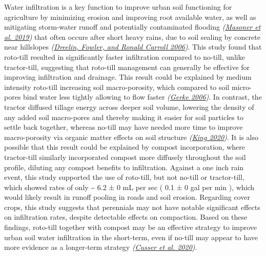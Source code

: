 \documentclass[
  12pt,
]{article}
\begin{document}
Water infiltration is a key function to improve urban soil functioning for agriculture by minimizing erosion and improving root available water, as well as mitigating storm-water runoff and potentially contaminated flooding \emph{(\protect\hyperlink{ref-masoner19}{Masoner et al. 2019})} that often occurs after short heavy rains, due to soil sealing by concrete near hillslopes \emph{(\protect\hyperlink{ref-dreelin06}{Dreelin, Fowler, and Ronald Carroll 2006})}.
This study found that roto-till resulted in significantly faster infiltration compared to no-till, unlike tractor-till, suggesting that roto-till management can generally be effective for improving infiltration and drainage.
This result could be explained by medium intensity roto-till increasing soil macro-porosity, which compared to soil micro-pores bind water less tightly allowing to flow faster \emph{(\protect\hyperlink{ref-gerke06}{Gerke 2006})}.
In contrast, the tractor diffused tillage energy across deeper soil volume, lowering the density of any added soil macro-pores and thereby making it easier for soil particles to settle back together, whereas no-till may have needed more time to improve macro-porosity via organic matter effects on soil structure \emph{(\protect\hyperlink{ref-king20}{King 2020})}.
It is also possible that this result could be explained by compost incorporation, where tractor-till similarly incorporated compost more diffusely throughout the soil profile, diluting any compost benefits to infiltration.
Against a one inch rain event, this study supported the use of roto-till, but not no-till or tractor-till, which showed rates of only
\textasciitilde{} 6.2 ±
0 mL per sec
(
0.1 ±
0 gal per min
),
which would likely result in runoff pooling in roads and soil erosion.
Regarding cover crops, this study suggests that perennials may not have notable significant effects on infiltration rates, despite detectable effects on compaction.
Based on these findings, roto-till together with compost may be an effective strategy to improve urban soil water infiltration in the short-term, even if no-till may appear to have more evidence as a longer-term strategy \emph{(\protect\hyperlink{ref-cusser20}{Cusser et al. 2020})}.
\end{document}
